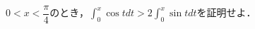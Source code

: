 \documentclass[../../main.tex]{subfiles}
\begin{document}
$\displaystyle 0<x<\dfrac{\pi}{4}$のとき，$\displaystyle \int_0^x \cos t dt > 2 \int_0^x \sin t dt$を証明せよ．
\end{document}
